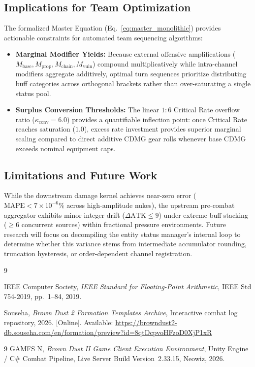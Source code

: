\documentclass[twocolumn,10pt]{article}
\begin{document}
\subsection{Implications for Team Optimization}
The formalized Master Equation (Eq.~\ref{eq:master_monolithic}) provides actionable constraints for automated team sequencing algorithms:
\begin{itemize}
    \item \textbf{Marginal Modifier Yields:} Because external offensive amplifications ($M_{\text{base}}, M_{\text{prop}}, M_{\text{chain}}, M_{\text{vuln}}$) compound multiplicatively while intra-channel modifiers aggregate additively, optimal turn sequences prioritize distributing buff categories across orthogonal brackets rather than over-saturating a single status pool.
    \item \textbf{Surplus Conversion Thresholds:} The linear $1:6$ Critical Rate overflow ratio ($\kappa_{\text{conv}} = 6.0$) provides a quantifiable inflection point: once Critical Rate reaches saturation ($1.0$), excess rate investment provides superior marginal scaling compared to direct additive CDMG gear rolls whenever base CDMG exceeds nominal equipment caps.
\end{itemize}

\subsection{Limitations and Future Work}
While the downstream damage kernel achieves near-zero error ($\text{MAPE} < 7 \times 10^{-6}\%$ across high-amplitude nukes), the upstream pre-combat aggregator exhibits minor integer drift ($\Delta \text{ATK} \le 9$) under extreme buff stacking ($\ge 6$ concurrent sources) within fractional pressure environments. Future research will focus on decompiling the entity status manager's internal loop to determine whether this variance stems from intermediate accumulator rounding, truncation hysteresis, or order-dependent channel registration.

\begin{thebibliography}{9}

IEEE Computer Society,
\textit{IEEE Standard for Floating-Point Arithmetic},
IEEE Std 754-2019, pp.~1--84, 2019.

Souseha,
\textit{Brown Dust 2 Formation Templates Archive},
Interactive combat log repository, 2026. [Online]. Available: \url{https://browndust2-db.souseha.com/en/formation/preview?id=8qtDcpvoHFzoD0XjP1xR}

\end{thebibliography}


\renewcommand{\refname}{Data and Telemetry Sources}
\begin{thebibliography}{9}
GAMFS N,
\textit{Brown Dust II Game Client Execution Environment},
Unity Engine / C\# Combat Pipeline, Live Server Build Version~2.33.15, Neowiz, 2026.
\end{thebibliography}
\end{document}
